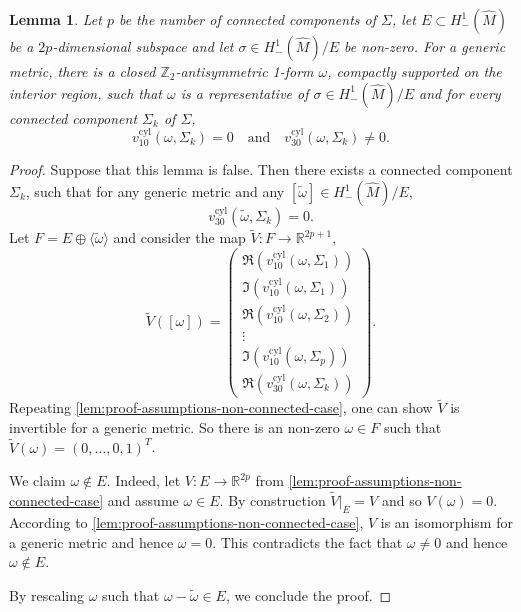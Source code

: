 \documentclass[preprint,12pt]{elsarticle}
\numberwithin{table}{section}
\newtheorem{lemma}{Lemma}[section]
\newcommand{\Z}{\mathbb{Z}}
\newcommand{\R}{\mathbb{R}}
\begin{document}
\begin{lemma}
	\label{lem:proof-assumptions-b-terms}
	Let $p$ be the number of connected components of $\Sigma$, let $E \subset H^1_-(\hat{M})$ be a $2p$-dimensional subspace and let $\sigma \in H^1_-(\hat M) / E$ be non-zero. For a generic metric, there is a closed $\Z_2$-antisymmetric 1-form $\omega$, compactly supported on the interior region, such that $\omega$ is a representative of $\sigma \in H^1_-(\hat M) / E$ and for every connected component $\Sigma_k$ of $\Sigma$,
	$$
	v^{\mathrm{cyl}}_{10}(\omega, \Sigma_k) = 0
	\quad \text{and} \quad
	v^{\mathrm{cyl}}_{30}(\omega, \Sigma_k) \not= 0.
	$$
\end{lemma}
\begin{proof}
	Suppose that this lemma is false. Then there exists a connected component $\Sigma_k$, such that for any generic metric and any $[\tilde \omega] \in H^1_-(\hat{M}) / E$,
	$$
	v^{\mathrm{cyl}}_{30}(\tilde \omega, \Sigma_k) = 0.
	$$
	Let $F = E \oplus \langle \tilde \omega \rangle $ and consider the map $\tilde V \colon F \to \R^{2p + 1}$, 
	$$
	\tilde V([\omega]) = \begin{pmatrix}
		\Re(v^{\mathrm{cyl}}_{10}(\omega, \Sigma_1))\\ \Im(v^{\mathrm{cyl}}_{10}(\omega, \Sigma_1)) \\
		\Re(v^{\mathrm{cyl}}_{10}(\omega, \Sigma_2))\\
		\vdots \\
		\Im(v^{\mathrm{cyl}}_{10}(\omega, \Sigma_p)) \\
		\Re(v^{\mathrm{cyl}}_{30}(\omega, \Sigma_k))
	\end{pmatrix}.$$
	Repeating \cref{lem:proof-assumptions-non-connected-case}, one can show $\tilde V$ is invertible for a generic metric. So there is an non-zero $\omega \in F$ such that $\tilde V(\omega) = (0, \ldots, 0, 1)^{T}$.

	We claim $\omega \not \in E$. Indeed, let $V \colon E \to \R^{2p}$ from \cref{lem:proof-assumptions-non-connected-case} and assume $\omega \in E$. By construction $\tilde V|_{E} = V$ and so $V(\omega) = 0$. According to \cref{lem:proof-assumptions-non-connected-case}, $V$ is an isomorphism for a generic metric and hence $\omega = 0$. This contradicts the fact that $\omega \not = 0$ and hence $\omega \not \in E$.
	
	By rescaling $\omega$ such that $\omega - \tilde \omega \in E$, we conclude the proof.
\end{proof}
\end{document}
